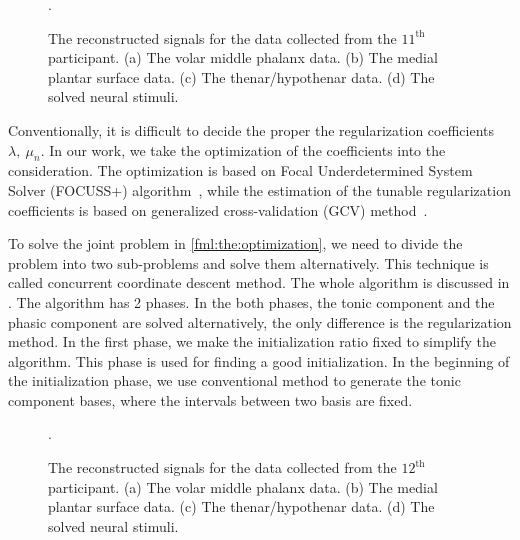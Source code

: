\documentclass[10pt,conference]{ieeeconf}
\begin{document}
\begin{figure}[!tb]
  \centering
  \DeclareGraphicsExtensions.
  \caption{The reconstructed signals for the data collected from the $11^{\mathrm{th}}$ participant. (a) The volar middle phalanx data. (b) The medial plantar surface data. (c) The thenar/hypothenar data. (d) The solved neural stimuli.} \label{fig:results}
\end{figure}

Conventionally, it is difficult to decide the proper the regularization coefficients $\lambda,~\mu_n$. In our work, we take the optimization of the coefficients into the consideration. The optimization is based on Focal Underdetermined System Solver (FOCUSS+) algorithm~\cite{murray2005visual}, while the estimation of the tunable regularization coefficients is based on  generalized cross-validation (GCV) method~\cite{zdunek2008improved}. 

To solve the joint problem in \eqref{fml:the:optimization}, we need to divide the problem into two sub-problems and solve them alternatively. This technique is called concurrent coordinate descent method. The whole algorithm is discussed in . The algorithm has 2 phases. In the both phases, the tonic component and the phasic component are solved alternatively, the only difference is the regularization method. In the first phase, we make the initialization ratio fixed to simplify the algorithm. This phase is used for finding a good initialization. In the beginning of the initialization phase, we use conventional method to generate the tonic component bases, where the intervals between two basis are fixed.

\begin{figure}[!tb]
  \centering
  \DeclareGraphicsExtensions.
  \caption{The reconstructed signals for the data collected from the $12^{\mathrm{th}}$ participant. (a) The volar middle phalanx data. (b) The medial plantar surface data. (c) The thenar/hypothenar data. (d) The solved neural stimuli.} \label{fig:12results}
\end{figure}
\end{document}
